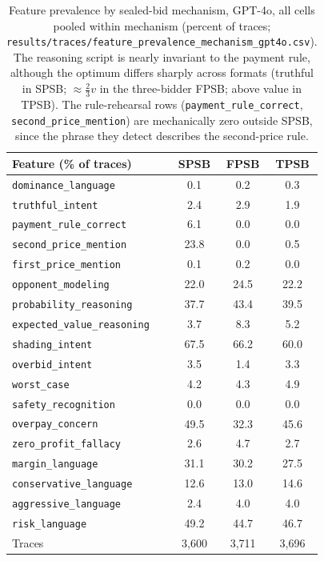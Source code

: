 \begin{table}[htbp]
\centering
\footnotesize
\setlength{\tabcolsep}{6pt}
\begin{tabular}{lccc}
\toprule
Feature (\% of traces) & SPSB & FPSB & TPSB \\
\midrule
\texttt{dominance\_language} & 0.1 & 0.2 & 0.3 \\
\texttt{truthful\_intent} & 2.4 & 2.9 & 1.9 \\
\texttt{payment\_rule\_correct} & 6.1 & 0.0 & 0.0 \\
\texttt{second\_price\_mention} & 23.8 & 0.0 & 0.5 \\
\texttt{first\_price\_mention} & 0.1 & 0.2 & 0.0 \\
\texttt{opponent\_modeling} & 22.0 & 24.5 & 22.2 \\
\texttt{probability\_reasoning} & 37.7 & 43.4 & 39.5 \\
\texttt{expected\_value\_reasoning} & 3.7 & 8.3 & 5.2 \\
\texttt{shading\_intent} & 67.5 & 66.2 & 60.0 \\
\texttt{overbid\_intent} & 3.5 & 1.4 & 3.3 \\
\texttt{worst\_case} & 4.2 & 4.3 & 4.9 \\
\texttt{safety\_recognition} & 0.0 & 0.0 & 0.0 \\
\texttt{overpay\_concern} & 49.5 & 32.3 & 45.6 \\
\texttt{zero\_profit\_fallacy} & 2.6 & 4.7 & 2.7 \\
\texttt{margin\_language} & 31.1 & 30.2 & 27.5 \\
\texttt{conservative\_language} & 12.6 & 13.0 & 14.6 \\
\texttt{aggressive\_language} & 2.4 & 4.0 & 4.0 \\
\texttt{risk\_language} & 49.2 & 44.7 & 46.7 \\
\midrule
Traces & 3{,}600 & 3{,}711 & 3{,}696 \\
\bottomrule
\end{tabular}
\caption{Feature prevalence by sealed-bid mechanism, GPT-4o, all cells pooled within mechanism (percent of traces; \texttt{results/traces/feature\_prevalence\_mechanism\_gpt4o.csv}). The reasoning script is nearly invariant to the payment rule, although the optimum differs sharply across formats (truthful in SPSB; $\approx\frac{2}{3}v$ in the three-bidder FPSB; above value in TPSB). The rule-rehearsal rows (\texttt{payment\_rule\_correct}, \texttt{second\_price\_mention}) are mechanically zero outside SPSB, since the phrase they detect describes the second-price rule.}
\label{tab:trace-prevalence-mechanisms}
\end{table}


